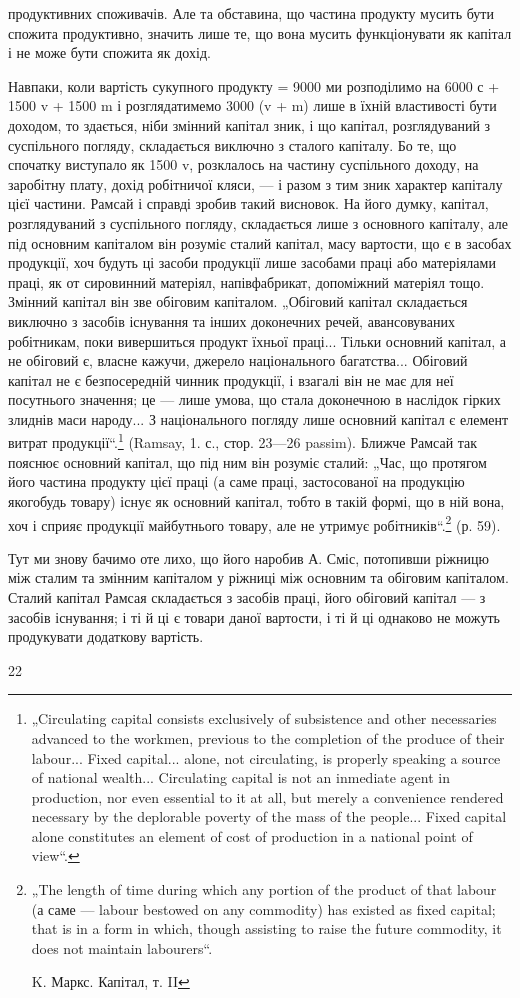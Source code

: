 продуктивних споживачів. Але та обставина, що частина продукту мусить
бути спожита продуктивно, значить лише те, що вона мусить
функціонувати як капітал і не може бути спожита як дохід.

Навпаки, коли вартість сукупного продукту = 9000 ми розподілимо
на 6000 с + 1500 v + 1500 m і розглядатимемо 3000 (v + m) лише
в їхній властивості бути доходом, то здається, ніби змінний капітал зник,
і що капітал, розглядуваний з суспільного погляду, складається виключно
з сталого капіталу. Бо те, що спочатку виступало як 1500 v, розклалось
на частину суспільного доходу, на заробітну плату, дохід робітничої
кляси, — і разом з тим зник характер капіталу цієї частини. Рамсай
і справді зробив такий висновок. На його думку, капітал, розглядуваний
з суспільного погляду, складається лише з основного капіталу, але під
основним капіталом він розуміє сталий капітал, масу вартости, що є в
засобах продукції, хоч будуть ці засоби продукції лише засобами праці
або матеріялами праці, як от сировинний матеріял, напівфабрикат, допоміжний
матеріял тощо. Змінний капітал він зве обіговим капіталом. „Обіговий
капітал складається виключно з засобів існування та інших доконечних
речей, авансовуваних робітникам, поки вивершиться продукт
їхньої праці... Тільки основний капітал, а не обіговий є, власне кажучи,
джерело національного багатства... Обіговий капітал не є безпосередній
чинник продукції, і взагалі він не має для неї посутнього значення; це —
лише умова, що стала доконечною в наслідок гірких злиднів маси народу...
З національного погляду лише основний капітал є елемент витрат
продукції“.\footnote*{
„Circulating capital consists exclusively of subsistence and other necessaries
advanced to the workmen, previous to the completion of the produce of their labour...
Fixed capital... alone, not circulating, is properly speaking a source of national
wealth... Circulating capital is not an inmediate agent in production, nor even essential
to it at all, but merely a convenience rendered necessary by the deplorable poverty
of the mass of the people... Fixed capital alone constitutes an element of cost of
production in a national point of view“.
} (Ramsay, 1. с., стор. 23—26 passim). Ближче Рамсай так
пояснює основний капітал, що під ним він розуміє сталий: „Час, що
протягом його частина продукту цієї праці (а саме праці, застосованої на
продукцію якогобудь товару) існує як основний капітал, тобто в такій
формі, що в ній вона, хоч і сприяє продукції майбутнього товару, але
не утримує робітників“.\footnote*{
„The length of time during which any portion of the product of that labour
(а саме — labour bestowed on any commodity) has existed as fixed capital; that is
in a form in which, though assisting to raise the future commodity, it does not
maintain labourers“.

K. Маркс. Капітал, т. II
} (р. 59).

Тут ми знову бачимо оте лихо, що його наробив А. Сміс, потопивши
ріжницю між сталим та змінним капіталом у ріжниці між основним та
обіговим капіталом. Сталий капітал Рамсая складається з засобів праці,
його обіговий капітал — з засобів існування; і ті й ці є товари даної
вартости, і ті й ці однаково не можуть продукувати додаткову
вартість.

22

